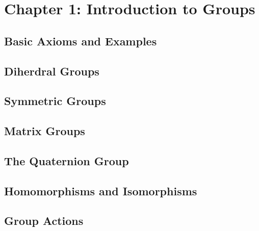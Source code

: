 \section{Chapter 1: Introduction to Groups}

\subsection{Basic Axioms and Examples}
\subsection{Diherdral Groups}
\subsection{Symmetric Groups}
\subsection{Matrix Groups}










\subsection{The Quaternion Group}
\subsection{Homomorphisms and Isomorphisms}
\subsection{Group Actions}

\newpage
